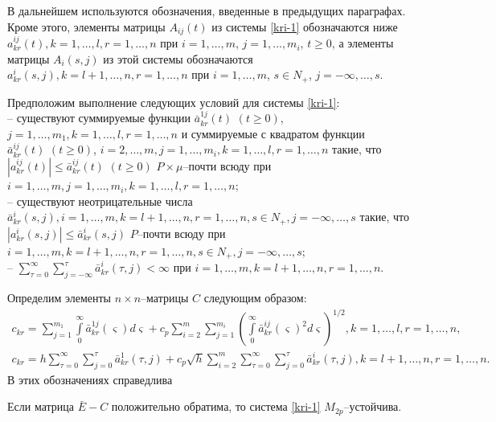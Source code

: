 В дальнейшем используются  обозначения, введенные в предыдущих
параграфах. Кроме этого, элементы матрицы $A_{ij}(t)$ из системы \eqref{kri-1}
обозначаются ниже $a^{ij}_{kr}(t), k =1,\dots,l, r = 1,\dots,n$  при $i
= 1,\dots,m$, $j = 1,\dots,m_i$, $t \geq 0$, а элементы матрицы
$A_i(s,j)$ из этой системы обозначаются $a^i_{kr}(s,j), k =
l+1,\dots,n, r = 1,\dots,n$ при $i=1,\dots,m$, $s\in N_+$,
$j=-\infty,\dots,s$.

Предположим выполнение следующих условий для системы \eqref{kri-1}:\\
\noindent
  -- существуют  суммируемые функции $\bar
a^{1j}_{kr}(t)\,\, (t\geq 0)$, $j = 1,\dots,m_1, k =1,\dots,l, r =
1,\dots,n$ и суммируемые с квадратом функции $\bar a^{ij}_{kr}(t)\,\,
(t\geq 0)$, $i = 2,\dots,m, j = 1,\dots,m_i, k =1,\dots,l, r = 1,\dots,n$
такие, что $|a^{ij}_{kr}(t)|\leq \bar a^{ij}_{kr}(t)\,\, (t\geq 0)$
$P\times\mu$--почти всюду при $i = 1, \dots, m, j = 1,\dots,m_i, k
=1,\dots,l, r = 1,\dots,n$;\\
  -- существуют
неотрицательные числа $\bar a^i_{kr}(s,j),i=1,\dots,m, k = l+1, \dots,
n, r = 1,\dots,n, s\in N_+, j=-\infty,\dots,s$ такие, что
$|a^i_{kr}(s,j)| \leq \bar a^i_{kr}(s,j)$ $P$--почти всюду при
$i=1,\dots,m, k = l+1, \dots, n, r = 1,\dots,n, s\in N_+, j=-\infty,\dots,s
$;\\
  -- $ \sum \limits _{\tau=0 }^{\infty }\sum \limits _{j = -\infty
}^{\tau}\bar a^{i}_{kr}(\tau,j) < \infty$ при $i=1,\dots,m, k = l+1,
\dots, n, r = 1,\dots,n$.

Определим элементы $n\times n$--матрицы $C$ следующим образом:
$$
\begin{array}{crl}
c_{kr} = \sum \limits_{j=1}^{m_1}\int \limits _0^{\infty } \bar
a^{1j}_{kr}(\varsigma)d\varsigma + c_p \sum \limits_{i=2}^m \sum
\limits_{j=1}^{m_i}\left(\int \limits _0^{\infty } \bar
a^{ij}_{kr}(\varsigma )^2d\varsigma \right)^{1/2},  k
= 1, \dots ,l, r = 1, \dots, n,\\
c_{kr} = h\sum \limits _{\tau=0 }^{\infty }\sum \limits _{j=0
}^{\tau}\bar a^{1}_{kr}(\tau,j) + c_p \sqrt{h}\sum \limits
_{i=2}^{m}\sum \limits _{\tau=0 }^{\infty }\sum \limits _{j=0
}^{\tau} \bar a^{i}_{kr}(\tau,j), k = l+1, \dots,n, r = 1, \dots, n.
\end{array}
$$
В этих обозначениях справедлива

\begin{theorem}\label{kri-th3} Если матрица $\bar E - C$ положительно
обратима, то система \eqref{kri-1} $M_{2p}$--устой\-чи\-ва.
\end{theorem}

